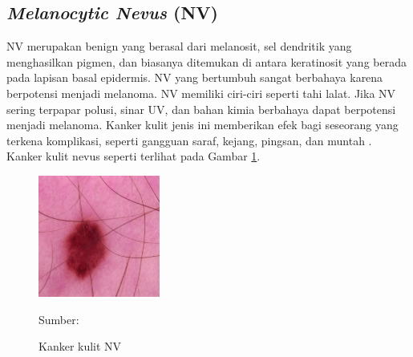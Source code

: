     \subsection{\textit{Melanocytic Nevus} (NV)}
    NV merupakan benign yang berasal dari melanosit, sel dendritik yang menghasilkan pigmen, dan biasanya ditemukan di antara keratinosit yang berada pada lapisan basal epidermis. NV yang bertumbuh sangat berbahaya karena berpotensi menjadi melanoma. NV memiliki ciri-ciri seperti tahi lalat. Jika NV sering terpapar polusi, sinar UV, dan bahan kimia berbahaya dapat berpotensi menjadi melanoma. Kanker kulit jenis ini memberikan efek bagi seseorang yang terkena komplikasi, seperti gangguan saraf, kejang, pingsan, dan muntah \citep{Fuadah2020a}. Kanker kulit nevus seperti terlihat pada Gambar \ref{fig:nv}.
    \begin{figure}[H] 
        \begin{center} 
            \includegraphics[width=4cm]{../img/Skin Cancer NV - Latex.jpg}
            \caption{Kanker kulit NV} 
            \label{fig:nv}
            Sumber: \citep{Codella2018,Combalia2019,Tschandl2018}
        \end{center} 
    \end{figure}

